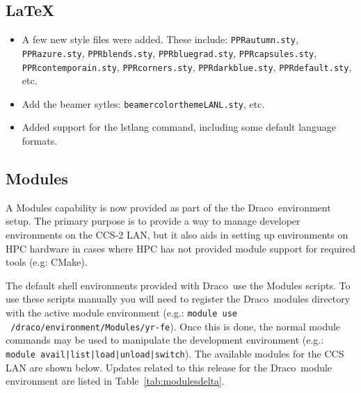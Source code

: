 \documentclass[note]{ResearchNote_pdf}
\newcommand{\draco}{Draco}
\newcommand{\cmake}{\textsf{CMake}}
\begin{document}
\subsection{\LaTeX}


\begin{itemize}
\item A few new style files were added.  These include:
  \texttt{PPRautumn.sty}, \texttt{PPRazure.sty}, \texttt{PPRblends.sty},
  \texttt{PPRbluegrad.sty}, \texttt{PPRcapsules.sty},
  \texttt{PPRcontemporain.sty}, \texttt{PPRcorners.sty},
  \texttt{PPRdarkblue.sty}, \texttt{PPRdefault.sty}, etc.
\item Add the beamer sytles: \texttt{beamercolorthemeLANL.sty}, etc.
\item Added support for the lstlang command, including some default
  language formats.
\end{itemize}


\subsection{Modules}

A \textsf{Modules} capability\cite{modulecmd} is now provided as part
of the the \draco\ environment setup.  The primary purpose is to
provide a way to manage developer environments on the CCS-2 LAN, but
it also aids in setting up environments on HPC hardware in cases where
HPC has not provided module support for required tools (e.g: \cmake).

The default shell environments provided with \draco\ use the Modules
scripts.  To use these scripts manually you will need to register the
\draco\ modules directory with the active module environment (e.g.:
\texttt{module use ~/draco/environment/Modules/yr-fe}).  Once this is
done, the normal module commands may be used to manipulate the
development environment (e.g.: \texttt{module
  avail|list|load|unload|switch}).  The available modules for the CCS
LAN are shown below. Updates related to this release for the
\draco\ module environment are listed in Table~\ref{tab:modulesdelta}.
\end{document}
